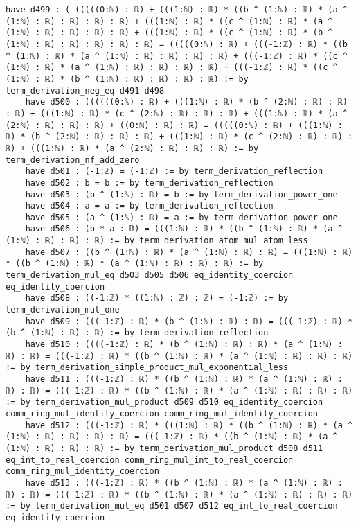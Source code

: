 \documentclass{article}
\begin{document}
\begin{tcolorbox}[colback=white!10, width=\linewidth]
\begin{lstlisting}[language=Lean4]
    have d499 : (-(((((0:ℕ) : ℝ) + (((1:ℕ) : ℝ) * ((b ^ (1:ℕ) : ℝ) * (a ^ (1:ℕ) : ℝ) : ℝ) : ℝ) : ℝ) + (((1:ℕ) : ℝ) * ((c ^ (1:ℕ) : ℝ) * (a ^ (1:ℕ) : ℝ) : ℝ) : ℝ) : ℝ) + (((1:ℕ) : ℝ) * ((c ^ (1:ℕ) : ℝ) * (b ^ (1:ℕ) : ℝ) : ℝ) : ℝ) : ℝ) : ℝ) = (((((0:ℕ) : ℝ) + (((-1:ℤ) : ℝ) * ((b ^ (1:ℕ) : ℝ) * (a ^ (1:ℕ) : ℝ) : ℝ) : ℝ) : ℝ) + (((-1:ℤ) : ℝ) * ((c ^ (1:ℕ) : ℝ) * (a ^ (1:ℕ) : ℝ) : ℝ) : ℝ) : ℝ) + (((-1:ℤ) : ℝ) * ((c ^ (1:ℕ) : ℝ) * (b ^ (1:ℕ) : ℝ) : ℝ) : ℝ) : ℝ) := by term_derivation_neg_eq d491 d498
    have d500 : ((((((0:ℕ) : ℝ) + (((1:ℕ) : ℝ) * (b ^ (2:ℕ) : ℝ) : ℝ) : ℝ) + (((1:ℕ) : ℝ) * (c ^ (2:ℕ) : ℝ) : ℝ) : ℝ) + (((1:ℕ) : ℝ) * (a ^ (2:ℕ) : ℝ) : ℝ) : ℝ) + ((0:ℕ) : ℝ) : ℝ) = (((((0:ℕ) : ℝ) + (((1:ℕ) : ℝ) * (b ^ (2:ℕ) : ℝ) : ℝ) : ℝ) + (((1:ℕ) : ℝ) * (c ^ (2:ℕ) : ℝ) : ℝ) : ℝ) + (((1:ℕ) : ℝ) * (a ^ (2:ℕ) : ℝ) : ℝ) : ℝ) := by term_derivation_nf_add_zero
    have d501 : (-1:ℤ) = (-1:ℤ) := by term_derivation_reflection
    have d502 : b = b := by term_derivation_reflection
    have d503 : (b ^ (1:ℕ) : ℝ) = b := by term_derivation_power_one
    have d504 : a = a := by term_derivation_reflection
    have d505 : (a ^ (1:ℕ) : ℝ) = a := by term_derivation_power_one
    have d506 : (b * a : ℝ) = (((1:ℕ) : ℝ) * ((b ^ (1:ℕ) : ℝ) * (a ^ (1:ℕ) : ℝ) : ℝ) : ℝ) := by term_derivation_atom_mul_atom_less
    have d507 : ((b ^ (1:ℕ) : ℝ) * (a ^ (1:ℕ) : ℝ) : ℝ) = (((1:ℕ) : ℝ) * ((b ^ (1:ℕ) : ℝ) * (a ^ (1:ℕ) : ℝ) : ℝ) : ℝ) := by term_derivation_mul_eq d503 d505 d506 eq_identity_coercion eq_identity_coercion
    have d508 : ((-1:ℤ) * ((1:ℕ) : ℤ) : ℤ) = (-1:ℤ) := by term_derivation_mul_one
    have d509 : (((-1:ℤ) : ℝ) * (b ^ (1:ℕ) : ℝ) : ℝ) = (((-1:ℤ) : ℝ) * (b ^ (1:ℕ) : ℝ) : ℝ) := by term_derivation_reflection
    have d510 : ((((-1:ℤ) : ℝ) * (b ^ (1:ℕ) : ℝ) : ℝ) * (a ^ (1:ℕ) : ℝ) : ℝ) = (((-1:ℤ) : ℝ) * ((b ^ (1:ℕ) : ℝ) * (a ^ (1:ℕ) : ℝ) : ℝ) : ℝ) := by term_derivation_simple_product_mul_exponential_less
    have d511 : (((-1:ℤ) : ℝ) * ((b ^ (1:ℕ) : ℝ) * (a ^ (1:ℕ) : ℝ) : ℝ) : ℝ) = (((-1:ℤ) : ℝ) * ((b ^ (1:ℕ) : ℝ) * (a ^ (1:ℕ) : ℝ) : ℝ) : ℝ) := by term_derivation_mul_product d509 d510 eq_identity_coercion comm_ring_mul_identity_coercion comm_ring_mul_identity_coercion
    have d512 : (((-1:ℤ) : ℝ) * (((1:ℕ) : ℝ) * ((b ^ (1:ℕ) : ℝ) * (a ^ (1:ℕ) : ℝ) : ℝ) : ℝ) : ℝ) = (((-1:ℤ) : ℝ) * ((b ^ (1:ℕ) : ℝ) * (a ^ (1:ℕ) : ℝ) : ℝ) : ℝ) := by term_derivation_mul_product d508 d511 eq_int_to_real_coercion comm_ring_mul_int_to_real_coercion comm_ring_mul_identity_coercion
    have d513 : (((-1:ℤ) : ℝ) * ((b ^ (1:ℕ) : ℝ) * (a ^ (1:ℕ) : ℝ) : ℝ) : ℝ) = (((-1:ℤ) : ℝ) * ((b ^ (1:ℕ) : ℝ) * (a ^ (1:ℕ) : ℝ) : ℝ) : ℝ) := by term_derivation_mul_eq d501 d507 d512 eq_int_to_real_coercion eq_identity_coercion

\end{lstlisting}
\end{tcolorbox}
\end{document}
